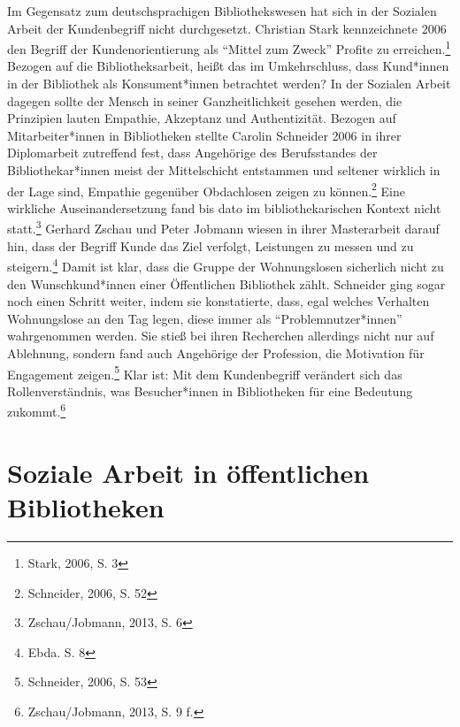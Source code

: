 \documentclass[a4paper,
fontsize=11pt,
oneside,
numbers=noperiodatend,
parskip=half-,
bibliography=totoc,
final
]{scrartcl}
\begin{document}
Im Gegensatz zum deutschsprachigen Bibliothekswesen hat sich in der
Sozialen Arbeit der Kundenbegriff nicht durchgesetzt. Christian Stark
kennzeichnete 2006 den Begriff der Kundenorientierung als
\enquote{Mittel zum Zweck} Profite zu erreichen.\footnote{Stark, 2006,
  S. 3} Bezogen auf die Bibliotheksarbeit, heißt das im Umkehrschluss,
dass Kund*innen in der Bibliothek als Konsument*innen betrachtet werden?
In der Sozialen Arbeit dagegen sollte der Mensch in seiner
Ganzheitlichkeit gesehen werden, die Prinzipien lauten Empathie,
Akzeptanz und Authentizität. Bezogen auf Mitarbeiter*innen in
Bibliotheken stellte Carolin Schneider 2006 in ihrer Diplomarbeit
zutreffend fest, dass Angehörige des Berufsstandes der
Bibliothekar*innen meist der Mittelschicht entstammen und seltener
wirklich in der Lage sind, Empathie gegenüber Obdachlosen zeigen zu
können.\footnote{Schneider, 2006, S. 52} Eine wirkliche
Auseinandersetzung fand bis dato im bibliothekarischen Kontext nicht
statt.\footnote{Zschau/Jobmann, 2013, S. 6} Gerhard Zschau und Peter
Jobmann wiesen in ihrer Masterarbeit darauf hin, dass der Begriff Kunde
das Ziel verfolgt, Leistungen zu messen und zu steigern.\footnote{Ebda.
  S. 8} Damit ist klar, dass die Gruppe der Wohnungslosen sicherlich
nicht zu den Wunschkund*innen einer Öffentlichen Bibliothek zählt.
Schneider ging sogar noch einen Schritt weiter, indem sie konstatierte,
dass, egal welches Verhalten Wohnungslose an den Tag legen, diese immer
als \enquote{Problemnutzer*innen} wahrgenommen werden. Sie stieß bei
ihren Recherchen allerdings nicht nur auf Ablehnung, sondern fand auch
Angehörige der Profession, die Motivation für Engagement
zeigen.\footnote{Schneider, 2006, S. 53} Klar ist: Mit dem Kundenbegriff
verändert sich das Rollenverständnis, was Besucher*innen in Bibliotheken
für eine Bedeutung zukommt.\footnote{Zschau/Jobmann, 2013, S. 9 f.}

\hypertarget{soziale-arbeit-in-uxf6ffentlichen-bibliotheken}{%
\section{Soziale Arbeit in öffentlichen
Bibliotheken}\label{soziale-arbeit-in-uxf6ffentlichen-bibliotheken}}
\end{document}
